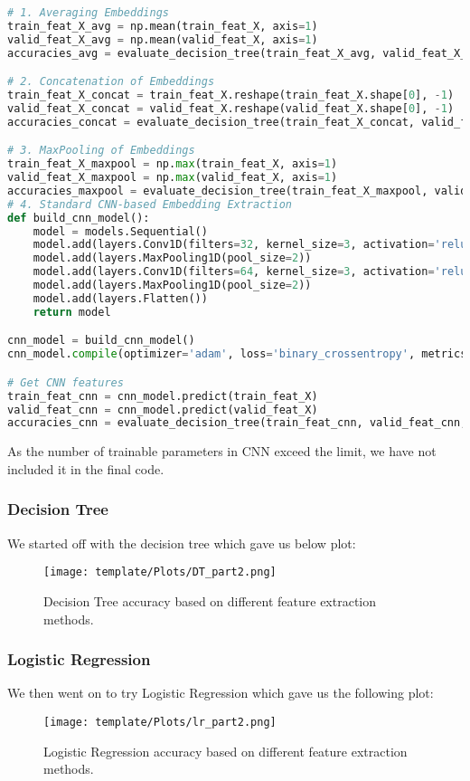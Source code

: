 \documentclass{article} %
\begin{document}
\begin{lstlisting}[language=Python]
# 1. Averaging Embeddings
train_feat_X_avg = np.mean(train_feat_X, axis=1)
valid_feat_X_avg = np.mean(valid_feat_X, axis=1)
accuracies_avg = evaluate_decision_tree(train_feat_X_avg, valid_feat_X_avg)

# 2. Concatenation of Embeddings
train_feat_X_concat = train_feat_X.reshape(train_feat_X.shape[0], -1)
valid_feat_X_concat = valid_feat_X.reshape(valid_feat_X.shape[0], -1)
accuracies_concat = evaluate_decision_tree(train_feat_X_concat, valid_feat_X_concat)

# 3. MaxPooling of Embeddings
train_feat_X_maxpool = np.max(train_feat_X, axis=1)
valid_feat_X_maxpool = np.max(valid_feat_X, axis=1)
accuracies_maxpool = evaluate_decision_tree(train_feat_X_maxpool, valid_feat_X_maxpool)
# 4. Standard CNN-based Embedding Extraction
def build_cnn_model():
    model = models.Sequential()
    model.add(layers.Conv1D(filters=32, kernel_size=3, activation='relu', input_shape=(13, 768)))
    model.add(layers.MaxPooling1D(pool_size=2))
    model.add(layers.Conv1D(filters=64, kernel_size=3, activation='relu'))
    model.add(layers.MaxPooling1D(pool_size=2))
    model.add(layers.Flatten())
    return model

cnn_model = build_cnn_model()
cnn_model.compile(optimizer='adam', loss='binary_crossentropy', metrics=['accuracy'])

# Get CNN features
train_feat_cnn = cnn_model.predict(train_feat_X)
valid_feat_cnn = cnn_model.predict(valid_feat_X)
accuracies_cnn = evaluate_decision_tree(train_feat_cnn, valid_feat_cnn, "CNN")
\end{lstlisting}
As the number of trainable parameters in CNN exceed the limit, we have not included it in the final code. 
\subsubsection{Decision Tree}
We started off with the decision tree which gave us below plot:

\begin{figure}[htbp]
    \centering
    \texttt{[image: template/Plots/DT\_part2.png]}
    \caption{Decision Tree accuracy based on different feature extraction methods.}
    \label{fig:4}
\end{figure}
\subsubsection{Logistic Regression}
We then went on to try Logistic Regression which gave us the following plot: 
\begin{figure}[htbp]
    \centering
    \texttt{[image: template/Plots/lr\_part2.png]}
    \caption{Logistic Regression accuracy based on different feature extraction methods.}
    \label{fig:5}
\end{figure}
\end{document}
